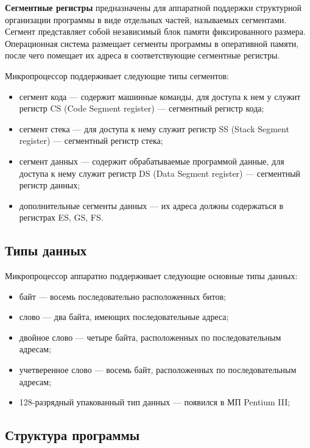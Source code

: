 \textbf{Сегментные регистры} предназначены для аппаратной поддержки структурной
организации программы в виде отдельных частей, называемых сегментами.
Сегмент представляет собой независимый блок памяти фиксированного размера.
Операционная система размещает сегменты программы в оперативной памяти,
после чего помещает их адреса в соответствующие сегментные регистры.

Микропроцессор поддерживает следующие типы сегментов:

\begin{itemize}
\item сегмент кода --- содержит машинные команды, для доступа к нем у служит регистр CS
  (Code Segment register) --- сегментный регистр кода;
\item сегмент стека --- для доступа к нему служит регистр SS (Stack Segment register) ---
  сегментный регистр стека;
\item сегмент данных --- содержит обрабатываемые программой данные, для доступа к нему
  служит регистр DS (Data Segment register) --- сегментный регистр данных;
\item
  дополнительные сегменты данных --- их адреса должны содержаться в регистрах ES, GS, FS.
\end{itemize}

\subsection{Типы данных}

Микропроцессор аппаратно поддерживает следующие основные типы данных:

\begin{itemize}
\item байт --- восемь последовательно расположенных битов;
\item слово --- два байта, имеющих последовательные адреса;
\item двойное слово --- четыре байта, расположенных по последовательным адресам;
\item учетверенное слово --- восемь байт, расположенных по последовательным адресам;
\item 128-разрядный упакованный тип данных --- появился в МП Pentium III;
\end{itemize}

\subsection{Структура программы}

